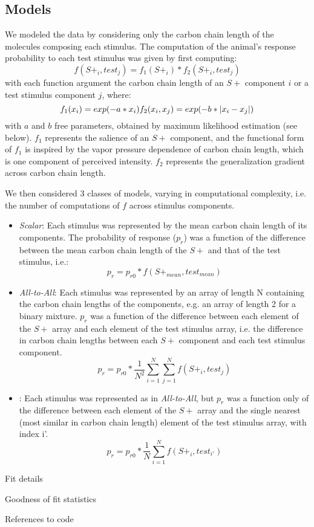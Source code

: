 \subsection*{Models}
\label{sec:methods_models}

We modeled the data by considering only the carbon chain length of the molecules composing each stimulus.  
The computation of the animal's response probability to each test stimulus was given by first computing: 
\begin{equation}
f(S+_i,test_j) = f_1(S+_i) * f_2(S+_i,test_j)
\end{equation}
with each function argument the carbon chain length of an $S+$ component $i$ or a test stimulus component $j$, where:
\begin{equation}
f_1(x_i) = exp(-a*x_i) \\
f_2(x_i,x_j) = exp(-b*|x_i-x_j|)
\end{equation}
with $a$ and $b$ free parameters, obtained by maximum likelihood estimation (see below).  
$f_1$ represents the salience of an $S+$ component, and the functional form of $f_1$ is inspired by the vapor pressure dependence of carbon chain length, which is one component of perceived intensity.  $f_2$ represents the generalization gradient across carbon chain length.  

We then considered 3 classes of models, varying in computational complexity, i.e. the number of computations of $f$ across stimulus components.  
\begin{itemize}
\item \textit{Scalar}: Each stimulus was represented by the mean carbon chain length of its components.  The probability of response ($p_r$) was a function of the difference between the mean carbon chain length of the $S+$ and that of the test stimulus, i.e.:
\begin{equation}
p_r = p_{r0} * f(S+_{mean},test_{mean})
\end{equation}
\item \textit{All-to-All}: Each stimulus was represented by an array of length N containing the carbon chain lengths of the components, e.g. an array of length 2 for a binary mixture. $p_r$ was a function of the difference between each element of the $S+$ array and each element of the test stimulus array, i.e. the difference in carbon chain lengths between each $S+$ component and each test stimulus component.  
\begin{equation}
p_r = p_{r0} * \frac{1}{N^2}\sum_{i=1}^{N}\sum_{j=1}^{N}f(S+_i,test_j)
\end{equation}
\item {}: Each stimulus was represented as in \textit{All-to-All}, but $p_r$ was a function only of the difference between each element of the $S+$ array and the single nearest (most similar in carbon chain length) element of the test stimulus array, with index i'.  
\begin{equation}
p_r = p_{r0} * \frac{1}{N}\sum_{i=1}^{N}f(S+_i,test_{i'})
\end{equation}
\end{itemize}

\item Fit details
\item Goodness of fit statistics
\item References to code
